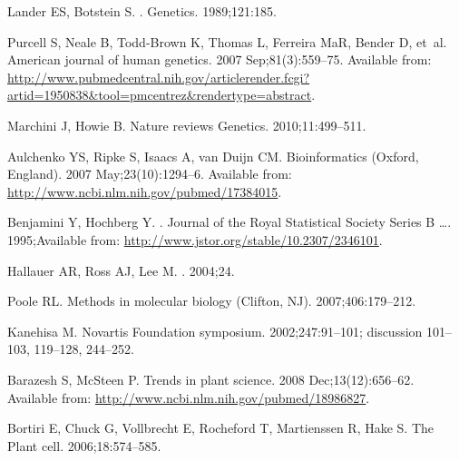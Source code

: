\documentclass[10pt,letterpaper]{article}
\begin{document}
\begin{thebibliography}{}
Lander ES, Botstein S.
.
\newblock Genetics. 1989;121:185.

Purcell S, Neale B, Todd-Brown K, Thomas L, Ferreira MaR, Bender D, et~al.
\newblock American journal of human genetics. 2007 Sep;81(3):559--75.
\newblock Available from:
  \url{http://www.pubmedcentral.nih.gov/articlerender.fcgi?artid=1950838\&tool=pmcentrez\&rendertype=abstract}.

Marchini J, Howie B.
\newblock Nature reviews Genetics. 2010;11:499--511.

Aulchenko YS, Ripke S, Isaacs A, van Duijn CM.
\newblock Bioinformatics (Oxford, England). 2007 May;23(10):1294--6.
\newblock Available from: \url{http://www.ncbi.nlm.nih.gov/pubmed/17384015}.

Benjamini Y, Hochberg Y.
.
\newblock Journal of the Royal Statistical Society Series B \ldots.
  1995;Available from: \url{http://www.jstor.org/stable/10.2307/2346101}.

Hallauer AR, Ross AJ, Lee M.
. 2004;24.

Poole RL.
\newblock Methods in molecular biology (Clifton, NJ). 2007;406:179--212.

Kanehisa M.
\newblock Novartis Foundation symposium. 2002;247:91--101; discussion 101--103,
  119--128, 244--252.

Barazesh S, McSteen P.
\newblock Trends in plant science. 2008 Dec;13(12):656--62.
\newblock Available from: \url{http://www.ncbi.nlm.nih.gov/pubmed/18986827}.

Bortiri E, Chuck G, Vollbrecht E, Rocheford T, Martienssen R, Hake S.
\newblock The Plant cell. 2006;18:574--585.


\end{thebibliography}
\end{document}
